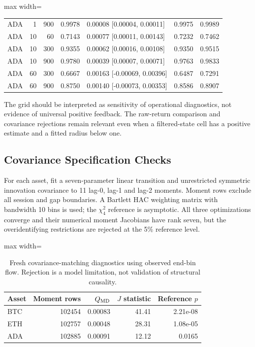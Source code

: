 \documentclass[12pt]{article}
\theoremstyle{definition}
\theoremstyle{remark}
\begin{document}
\begin{table}[htbp]
\begin{adjustbox}{max width=\textwidth}
\begin{tabular}{lrrrlll}
ADA & 1 & 900 & 0.9978 & 0.00008 [0.00004, 0.00011] & 0.9975 & 0.9989 \\
ADA & 10 & 60 & 0.7143 & 0.00077 [0.00011, 0.00143] & 0.7232 & 0.7462 \\
ADA & 10 & 300 & 0.9355 & 0.00062 [0.00016, 0.00108] & 0.9350 & 0.9515 \\
ADA & 10 & 900 & 0.9780 & 0.00039 [0.00007, 0.00071] & 0.9763 & 0.9833 \\
ADA & 60 & 300 & 0.6667 & 0.00163 [-0.00069, 0.00396] & 0.6487 & 0.7291 \\
ADA & 60 & 900 & 0.8750 & 0.00140 [-0.00073, 0.00353] & 0.8586 & 0.8907 \\
\bottomrule\end{tabular}
\end{adjustbox}
\end{table}

The grid should be interpreted as sensitivity of operational diagnostics, not evidence of universal positive feedback. The raw-return comparison and covariance rejections remain relevant even when a filtered-state cell has a positive estimate and a fitted radius below one.

\subsection{Covariance Specification Checks}
For each asset, fit a seven-parameter linear transition and unrestricted symmetric innovation covariance to 11 lag-0, lag-1 and lag-2 moments. Moment rows exclude all session and gap boundaries. A Bartlett HAC weighting matrix with bandwidth 10 bins is used; the $\chi^2_4$ reference is asymptotic. All three optimizations converge and their numerical moment Jacobians have rank seven, but the overidentifying restrictions are rejected at the 5\% reference level.

\begin{table}[htbp]
\centering\small
\caption{Fresh covariance-matching diagnostics using observed end-bin flow. Rejection is a model limitation, not validation of structural causality.}
\label{tab:md_revised}
\begin{adjustbox}{max width=\textwidth}
\begin{tabular}{lrrrr}\toprule
Asset & Moment rows & $Q_{\rm MD}$ & $J$ statistic & Reference $p$ \\\midrule
BTC & 102454 & 0.00083 & 41.41 & 2.21e-08 \\
ETH & 102757 & 0.00048 & 28.31 & 1.08e-05 \\
ADA & 102885 & 0.00091 & 12.12 & 0.0165 \\
\bottomrule\end{tabular}
\end{adjustbox}
\end{table}
\end{document}
